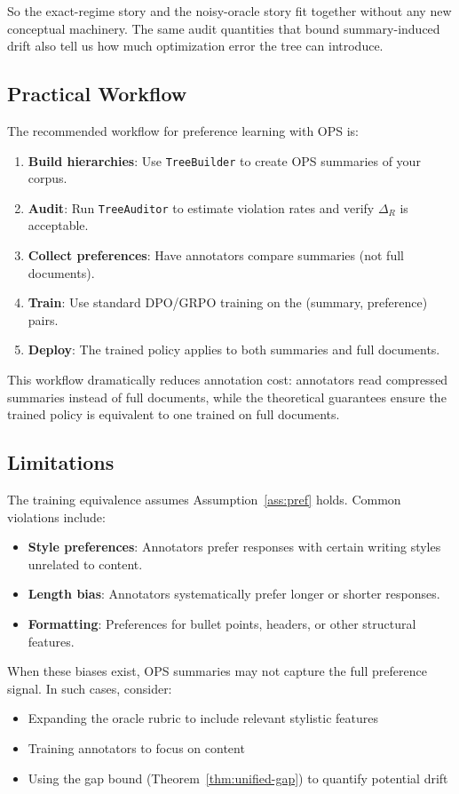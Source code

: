 So the exact-regime story and the noisy-oracle story fit together without any
new conceptual machinery. The same audit quantities that bound summary-induced
drift also tell us how much optimization error the tree can introduce.

\subsection{Practical Workflow}

The recommended workflow for preference learning with OPS is:

\begin{enumerate}
    \item \textbf{Build hierarchies}: Use \texttt{TreeBuilder} to create OPS summaries of your corpus.
    \item \textbf{Audit}: Run \texttt{TreeAuditor} to estimate violation rates and verify $\Delta_R$ is acceptable.
    \item \textbf{Collect preferences}: Have annotators compare summaries (not full documents).
    \item \textbf{Train}: Use standard DPO/GRPO training on the (summary, preference) pairs.
    \item \textbf{Deploy}: The trained policy applies to both summaries and full documents.
\end{enumerate}

This workflow dramatically reduces annotation cost: annotators read compressed summaries instead of full documents, while the theoretical guarantees ensure the trained policy is equivalent to one trained on full documents.

\subsection{Limitations}

The training equivalence assumes Assumption~\ref{ass:pref} holds. Common violations include:
\begin{itemize}[nosep]
    \item \textbf{Style preferences}: Annotators prefer responses with certain writing styles unrelated to content.
    \item \textbf{Length bias}: Annotators systematically prefer longer or shorter responses.
    \item \textbf{Formatting}: Preferences for bullet points, headers, or other structural features.
\end{itemize}

When these biases exist, OPS summaries may not capture the full preference signal. In such cases, consider:
\begin{itemize}[nosep]
    \item Expanding the oracle rubric to include relevant stylistic features
    \item Training annotators to focus on content
    \item Using the gap bound (Theorem~\ref{thm:unified-gap}) to quantify potential drift
\end{itemize}
